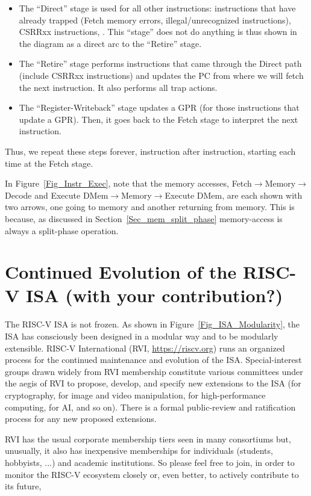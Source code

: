 \begin{itemize}
\item The ``Direct'' stage is used for all other instructions:
instructions that have already trapped (Fetch memory errors,
illegal/unrecognized instructions), CSRRxx instructions, {\etc}.  This
``stage'' does not do anything is thus shown in the diagram as a
direct arc to the ``Retire'' stage.

\item The ``Retire'' stage performs instructions that came through the
Direct path (include CSRRxx instructions) and updates the PC from
where we will fetch the next instruction.  It also performs all trap
actions.

\item The ``Register-Writeback'' stage updates a GPR (for those
instructions that update a GPR).  Then, it goes back to the Fetch
stage to interpret the next instruction.

\end{itemize}

Thus, we repeat these steps forever, instruction after instruction,
starting each time at the Fetch stage.

In Figure~\ref{Fig_Instr_Exec}, note that the memory accesses,
Fetch$\longrightarrow$Memory$\longrightarrow$Decode and Execute
DMem$\longrightarrow$Memory$\longrightarrow$Execute DMem, are each
shown with two arrows, one going to memory and another returning from
memory.  This is because, as discussed in
Section~\ref{Sec_mem_split_phase} memory-access is always a
split-phase operation.


\section{Continued Evolution of the RISC-V ISA (with your contribution?)}


The RISC-V ISA is not frozen.  As shown in
Figure~\ref{Fig_ISA_Modularity}, the ISA has consciously been designed
in a modular way and to be modularly extensible.  RISC-V International
(RVI, \url{https://riscv.org}) runs an organized process for the
continued maintenance and evolution of the ISA.  Special-interest
groups drawn widely from RVI membership constitute various committees
under the aegis of RVI to propose, develop, and specify new extensions
to the ISA (for cryptography, for image and video manipulation, for
high-performance computing, for AI, and so on).  There is a formal
public-review and ratification process for any new proposed
extensions.

RVI has the usual corporate membership tiers seen in many consortiums
but, unusually, it also has inexpensive memberships for individuals
(students, hobbyists, ...)  and academic institutions.  So please feel
free to join, in order to monitor the RISC-V ecosystem closely or,
even better, to actively contribute to its future,

